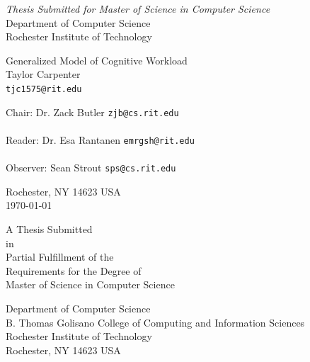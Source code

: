 \documentclass[11pt]{article}
\begin{document}
\thispagestyle{empty}
\begin{center}
\begin{Large}
\emph{Thesis Submitted for Master of Science in Computer Science} \\
Department of Computer Science \\
Rochester Institute of Technology \\
\end{Large}
\vspace{4em}
{\huge Generalized Model of Cognitive Workload} \\
\vspace{3em}
{\LARGE Taylor Carpenter} \\
{\tt tjc1575@rit.edu} \\
\vspace{3em}
\begin{adjustwidth}{.5in}{.5in}
Chair: Dr. Zack Butler \hfill {\tt zjb@cs.rit.edu} \\
\vspace{2em}
\hrulefill \\
\vspace{3em}
Reader: Dr. Esa Rantanen \hfill {\tt emrgsh@rit.edu} \\
\vspace{2em}
\hrulefill \\
\vspace{3em}
Observer: Sean Strout \hfill {\tt sps@cs.rit.edu} \\
\vspace{2em}
\hrulefill
\end{adjustwidth}
\vspace{2em}
Rochester, NY 14623 USA \\
\vspace{2em}
\today
\end{center}
\pagebreak
\thispagestyle{empty}
\begin{center}
\begin{large}
A Thesis Submitted\\
in\\
Partial Fulfillment of the\\
Requirements for the Degree of\\
Master of Science in Computer Science

\vspace{.5in}

Department of Computer Science\\
B. Thomas Golisano College of Computing and Information Sciences\\
Rochester Institute of Technology\\
Rochester, NY 14623 USA
\end{large}
\end{center}
\end{document}
